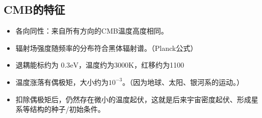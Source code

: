 \documentclass[12pt]{ctexart}
\begin{document}
\subsection{CMB的特征}

\begin{itemize}
    \item 各向同性：来自所有方向的CMB温度高度相同。
    \item 辐射场强度随频率的分布符合黑体辐射谱。（Planck公式）
    \item 退耦能标约为 $0.3\mathrm{eV}$，温度约为3000K，红移约为1100
    \item 温度涨落有偶极矩，大小约为$10^{-3}$。（因为地球、太阳、银河系的运动。）
    \item 扣除偶极矩后，仍然存在微小的温度起伏，这就是后来宇宙密度起伏、形成星系等结构的种子/初始条件。
\end{itemize}
\end{document}
